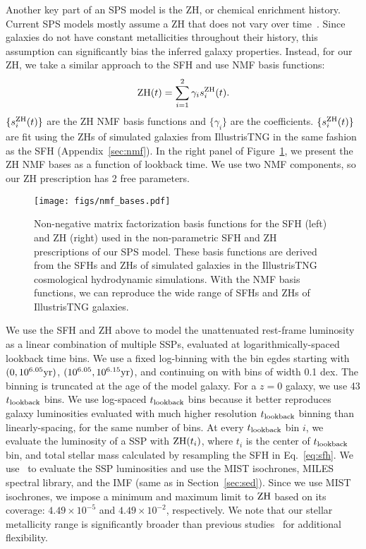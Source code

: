 Another key part of an SPS model is the ZH, or chemical enrichment history. 
Current SPS models mostly assume a ZH that does not vary over
time~\citep{carnall2017, leja2019}. 
Since galaxies do not have constant metallicities throughout their history,
this assumption can significantly bias the inferred galaxy properties. 
Instead, for our ZH, we take a similar approach to the SFH and use NMF basis
functions:
\begin{equation}
    {\rm ZH}(t) = \sum\limits_{i=1}^2 \gamma_i s_i^{\rm ZH}(t).
\end{equation} 
$\{s_i^{\rm ZH}(t)\}$ are the ZH NMF basis functions and $\{\gamma_i\}$ are the
coefficients. 
$\{s_i^{\rm ZH}(t)\}$ are fit using the ZHs of simulated galaxies from
IllustrisTNG in the same fashion as the SFH (Appendix~\ref{sec:nmf}). 
In the right panel of Figure~\ref{fig:nmf}, we present the ZH NMF bases as a
function of lookback time. 
We use two NMF components, so our ZH prescription has 2 free parameters. 

\begin{figure}
\begin{center}
\texttt{[image: figs/nmf\_bases.pdf]} 
    \caption{
        Non-negative matrix factorization basis functions for the SFH (left)
        and ZH (right) used in the non-parametric SFH and ZH prescriptions of
        our SPS model. 
        These basis functions are derived from the SFHs and ZHs of simulated
        galaxies in the IllustrisTNG cosmological hydrodynamic simulations. 
        With the NMF basis functions, we can reproduce the wide range of SFHs
        and ZHs of IllustrisTNG galaxies.  
    }
    \label{fig:nmf}
\end{center}
\end{figure}

We use the SFH and ZH above to model the unattenuated rest-frame luminosity as
a linear combination of multiple SSPs, evaluated at logarithmically-spaced
lookback time bins.
We use a fixed log-binning with the bin egdes starting with $(0, 10^{6.05}{\rm
yr})$, $(10^{6.05}, 10^{6.15}{\rm yr})$, and continuing on with bins of width
0.1 dex.
The binning is truncated at the age of the model galaxy. 
For a $z=0$ galaxy, we use 43 $t_{\rm lookback}$ bins.
We use log-spaced $t_{\rm lookback}$ bins because it better reproduces galaxy luminosities
evaluated with much higher resolution $t_{\rm lookback}$ binning than linearly-spacing, for
the same number of bins. 
At every $t_{\rm lookback}$ bin $i$, we evaluate the luminosity of a SSP with ${\rm
ZH}(t_i)$, where $t_i$ is the center of $t_{\rm lookback}$ bin, and total stellar mass
calculated by resampling the SFH in Eq.~\ref{eq:sfh}. 
We use \fsps~to evaluate the SSP luminosities and use the MIST isochrones, MILES
spectral library, and the \cite{chabrier2003} IMF (same as in
Section~\ref{sec:sed}).  
Since we use MIST isochrones, we impose a minimum and maximum limit to ${\rm
ZH}$ based on its coverage: $4.49\times10^{-5}$ and $4.49\times10^{-2}$,
respectively.
We note that our stellar metallicity range is significantly broader than
previous studies~\citep[\emph{e.g.}][]{carnall2017, leja2017, tacchella2021}
for additional flexibility. 

